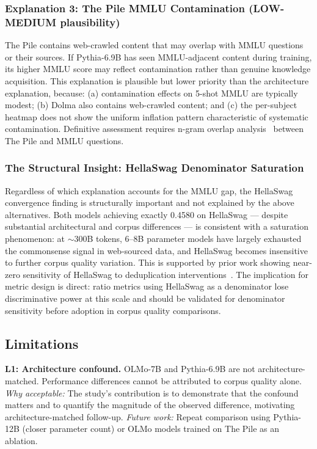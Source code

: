 \subsubsection{Explanation 3: The Pile MMLU Contamination (LOW-MEDIUM plausibility)}

The Pile contains web-crawled content that may overlap with MMLU questions or their sources. If Pythia-6.9B has seen MMLU-adjacent content during training, its higher MMLU score may reflect contamination rather than genuine knowledge acquisition. This explanation is plausible but lower priority than the architecture explanation, because: (a) contamination effects on 5-shot MMLU are typically modest; (b) Dolma also contains web-crawled content; and (c) the per-subject heatmap does not show the uniform inflation pattern characteristic of systematic contamination. Definitive assessment requires n-gram overlap analysis~\cite{shi2024detecting} between The Pile and MMLU questions.

\subsubsection{The Structural Insight: HellaSwag Denominator Saturation}

Regardless of which explanation accounts for the MMLU gap, the HellaSwag convergence finding is structurally important and not explained by the above alternatives. Both models achieving exactly 0.4580 on HellaSwag --- despite substantial architectural and corpus differences --- is consistent with a saturation phenomenon: at $\sim$300B tokens, 6--8B parameter models have largely exhausted the commonsense signal in web-sourced data, and HellaSwag becomes insensitive to further corpus quality variation. This is supported by prior work showing near-zero sensitivity of HellaSwag to deduplication interventions~\cite{Penedo2023RefinedWeb}. The implication for metric design is direct: ratio metrics using HellaSwag as a denominator lose discriminative power at this scale and should be validated for denominator sensitivity before adoption in corpus quality comparisons.

\subsection{Limitations}

\textbf{L1: Architecture confound.} OLMo-7B and Pythia-6.9B are not architecture-matched. Performance differences cannot be attributed to corpus quality alone.
\textit{Why acceptable:} The study's contribution is to demonstrate that the confound matters and to quantify the magnitude of the observed difference, motivating architecture-matched follow-up.
\textit{Future work:} Repeat comparison using Pythia-12B (closer parameter count) or OLMo models trained on The Pile as an ablation.

